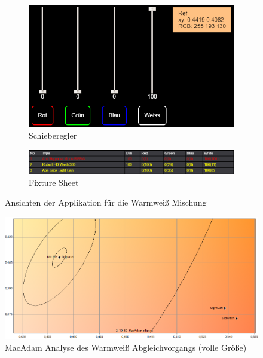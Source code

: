 \documentclass[11pt]{scrartcl}
\begin{document}
\noindent
\begin{figure}[H]
    \centering
    \begin{subfigure}[b]{.39\textwidth}
        \includegraphics[width=\textwidth]{images/app_mix_warmWhite_faders.png}
        \caption{Schieberegler}
    \end{subfigure}
    \hfill 
    \begin{subfigure}[b]{.59\textwidth}
        \includegraphics[width=\textwidth]{images/app_mix_warmWhite_fixtureSheet.png}
        \caption{Fixture Sheet}
    \end{subfigure}
    \caption{Ansichten der Applikation für die Warmweiß Mischung}
\end{figure}
\begin{figure}[H]
    \begin{center}
        \includegraphics[width=\textwidth]{images/macAdam/comparedWarmWhite.png}
    \end{center}
    \caption{MacAdam Analyse des Warmweiß Abgleichvorgangs (volle Größe)}
\end{figure}
\end{document}
